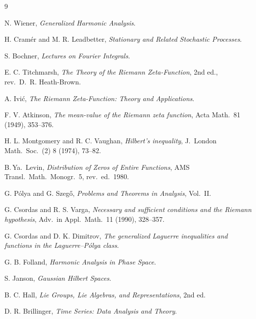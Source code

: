 \documentclass[11pt,reqno]{amsart}
\theoremstyle{plain}
\theoremstyle{definition}
\theoremstyle{remark}
\begin{document}
\begin{thebibliography}{9}

N. Wiener, \emph{Generalized Harmonic Analysis}.

H. Cram\'er and M. R. Leadbetter, \emph{Stationary and Related Stochastic
Processes}.

S. Bochner, \emph{Lectures on Fourier Integrals}.

E. C. Titchmarsh, \emph{The Theory of the Riemann Zeta-Function}, 2nd ed.,
rev.\ D.~R. Heath-Brown.

A. Ivi\'c, \emph{The Riemann Zeta-Function: Theory and Applications}.

F. V. Atkinson, \emph{The mean-value of the Riemann zeta function},
Acta Math.\ 81 (1949), 353--376.

H. L. Montgomery and R. C. Vaughan, \emph{Hilbert's inequality},
J.~London Math.\ Soc.\ (2) 8 (1974), 73--82.

B.\,Ya.~Levin, \emph{Distribution of Zeros of Entire Functions},
AMS Transl.\ Math.\ Monogr.\ 5, rev.\ ed.\ 1980.

G. P\'olya and G. Szeg\H o, \emph{Problems and Theorems in Analysis}, Vol.~II.

G. Csordas and R. S. Varga, \emph{Necessary and sufficient conditions and
the Riemann hypothesis}, Adv.\ in Appl.\ Math.\ 11 (1990), 328--357.

G. Csordas and D. K. Dimitrov, \emph{The generalized Laguerre inequalities
and functions in the Laguerre--P\'olya class}.

G. B. Folland, \emph{Harmonic Analysis in Phase Space}.

S. Janson, \emph{Gaussian Hilbert Spaces}.

B. C. Hall, \emph{Lie Groups, Lie Algebras, and Representations}, 2nd ed.

D. R. Brillinger, \emph{Time Series: Data Analysis and Theory}.

\end{thebibliography}
\end{document}
